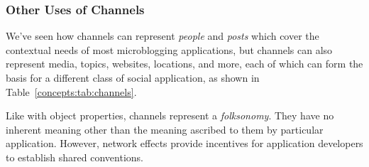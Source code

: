 



\subsubsection{Other Uses of Channels}

We've seen how channels can represent \emph{people} and \emph{posts}
which cover the contextual needs of most microblogging applications,
but channels can also represent
media, topics, websites, locations, and more,
each of which can form the basis for a different class of
social application, as shown in Table~\ref{concepts:tab:channels}.

Like with object properties, channels represent a \emph{folksonomy}.
They have no inherent meaning other than the meaning ascribed to them
by particular application. However, network effects provide incentives for
application developers to establish shared conventions.

